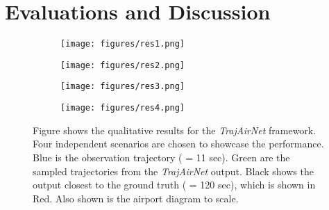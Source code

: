 \documentclass[letterpaper, 10 pt, conference]{ieeeconf}
\begin{document}
\section{Evaluations and Discussion}\label{sec:eval}
\begin{figure*}[h!]
     \centering
     \begin{subfigure}[b]{0.24\textwidth}
         \centering
    \texttt{[image: figures/res1.png]}
    \caption{}
         \label{fig:result_a}
     \end{subfigure}
     \begin{subfigure}[b]{0.24\textwidth}
         \centering
        \texttt{[image: figures/res2.png]}
            \caption{}
         \label{fig:result_b}
     \end{subfigure}
     \begin{subfigure}[b]{0.24\textwidth}
         \centering
    \texttt{[image: figures/res3.png]}
        \caption{}
         \label{fig:result_c}
     \end{subfigure}
     \begin{subfigure}[b]{0.24\textwidth}
         \centering
    \texttt{[image: figures/res4.png]}
        \caption{}
         \label{fig:result_d}
     \end{subfigure}
\caption{Figure shows the qualitative results for the \textit{TrajAirNet} framework. Four independent scenarios are chosen to showcase the performance. Blue is the observation trajectory ( = 11 sec). Green are the sampled trajectories from the \textit{TrajAirNet} output. Black shows the output closest to the ground truth ( = 120 sec), which is shown in Red. Also shown is the airport diagram to scale.}
    \label{fig:four_results}        
\end{figure*}
\end{document}
